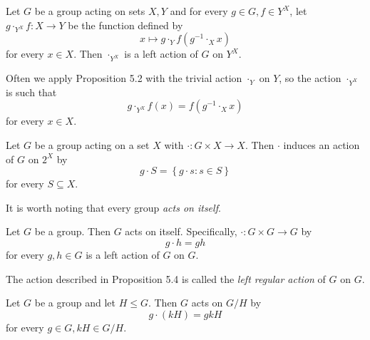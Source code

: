 \documentclass[pmath347]{subfiles}
\begin{document}
    \begin{prop}{}
        Let $G$ be a group acting on sets $X,Y$ and for every $g\in G, f\in Y^X$, let $g\cdot_{Y^X} f:X\to Y$ be the function defined by
        \begin{equation*}
            x\mapsto g\cdot_Y f\left( g^{-1} \cdot_X x \right) 
        \end{equation*}
        for every $x\in X$. Then $\cdot_{Y^X}$ is a left action of $G$ on $Y^X$.
    \end{prop}

    \np Often we apply Proposition 5.2 with the trivial action $\cdot_Y$ on $Y$, so the action $\cdot_{Y^X}$ is such that
    \begin{equation*}
        g\cdot_{Y^X} f\left( x \right) = f\left( g^{-1} \cdot_X x \right) 
    \end{equation*}
    for every $x\in X$.

    \begin{prop}{}
        Let $G$ be a group acting on a set $X$ with $\cdot: G\times X\to X$. Then $\cdot$ induces an action of $G$ on $2^X$ by
        \begin{equation*}
            g\cdot S = \left\lbrace g\cdot s:s\in S \right\rbrace 
        \end{equation*}
        for every $S\subseteq X$.
    \end{prop}

    \np It is worth noting that every group \textit{acts on itself}.

    \clearpage
    \begin{prop}{}
        Let $G$ be a group. Then $G$ acts on itself. Specifically, $\cdot:G\times G\to G$ by
        \begin{equation*}
            g\cdot h = gh
        \end{equation*}
        for every $g,h\in G$ is a left action of $G$ on $G$.
    \end{prop}

    \noindent The action described in Proposition 5.4 is called the \emph{left regular action} of $G$ on $G$.

    \begin{prop}{}
        Let $G$ be a group and let $H\leq G$. Then $G$ acts on $G /H$ by
        \begin{equation*}
            g\cdot \left( kH \right) = gkH
        \end{equation*}
        for every $g\in G, kH\in G /H$.
    \end{prop}
\end{document}
